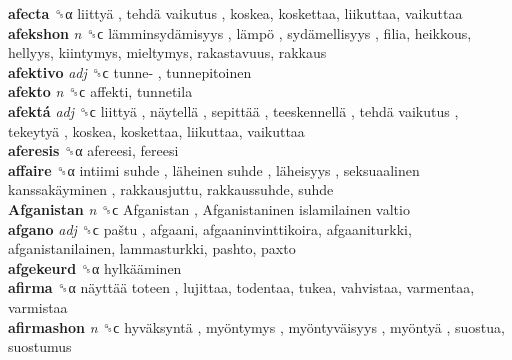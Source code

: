 \textbf{afecta} ␝α   liittyä ,  tehdä vaikutus , koskea, koskettaa, liikuttaa, vaikuttaa  \\
\textbf{afekshon} \emph{n}  ␝ϲ   lämminsydämisyys ,  lämpö ,  sydämellisyys , filia, heikkous, hellyys, kiintymys, mieltymys, rakastavuus, rakkaus  \\
\textbf{afektivo} \emph{adj}  ␝ϲ   tunne- , tunnepitoinen  \\
\textbf{afekto} \emph{n}  ␝ϲ  affekti, tunnetila  \\
\textbf{afektá} \emph{adj}  ␝ϲ   liittyä ,  näytellä ,  sepittää ,  teeskennellä ,  tehdä vaikutus ,  tekeytyä , koskea, koskettaa, liikuttaa, vaikuttaa  \\
\textbf{aferesis} ␝α  afereesi, fereesi  \\
\textbf{affaire} ␝α   intiimi suhde ,  läheinen suhde ,  läheisyys ,  seksuaalinen kanssakäyminen , rakkausjuttu, rakkaussuhde, suhde  \\
\textbf{Afganistan} \emph{n}  ␝ϲ   Afganistan ,  Afganistaninen islamilainen valtio   \\
\textbf{afgano} \emph{adj}  ␝ϲ   paštu , afgaani, afgaaninvinttikoira, afgaaniturkki, afganistanilainen, lammasturkki, pashto, paxto  \\
\textbf{afgekeurd} ␝α   hylkääminen   \\
\textbf{afirma} ␝α   näyttää toteen , lujittaa, todentaa, tukea, vahvistaa, varmentaa, varmistaa  \\
\textbf{afirmashon} \emph{n}  ␝ϲ   hyväksyntä ,  myöntymys ,  myöntyväisyys ,  myöntyä , suostua, suostumus  \\
